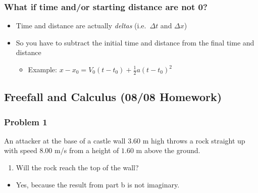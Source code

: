 \documentclass[
  letterpaper,
  DIV=11,
  numbers=noendperiod]{scrartcl}
\providecommand{\tightlist}{%
  \setlength{\itemsep}{0pt}\setlength{\parskip}{0pt}}\usepackage{longtable,booktabs,array}
\begin{document}
\hypertarget{what-if-time-andor-starting-distance-are-not-0}{%
\subsubsection{What if time and/or starting distance are not
0?}\label{what-if-time-andor-starting-distance-are-not-0}}

\begin{itemize}
\tightlist
\item
  Time and distance are actually \emph{deltas} (i.e.~\(\Delta t\) and
  \(\Delta x\))
\item
  So you have to subtract the initial time and distance from the final
  time and distance

  \begin{itemize}
  \tightlist
  \item
    Example: \(x-x_0 = V_0(t-t_0) + \frac{1}{2}a(t-t_0)^2\)
  \end{itemize}
\end{itemize}

\hypertarget{freefall-and-calculus-0808-homework}{%
\subsection{Freefall and Calculus (08/08
Homework)}\label{freefall-and-calculus-0808-homework}}

\hypertarget{problem-1-3}{%
\subsubsection{Problem 1}\label{problem-1-3}}

An attacker at the base of a castle wall \(3.60\) m high throws a rock
straight up with speed \(8.00\) m/s from a height of \(1.60\) m above
the ground.

\begin{enumerate}
\def\labelenumi{(\alph{enumi})}
\tightlist
\item
  Will the rock reach the top of the wall?
\end{enumerate}

\begin{itemize}
\tightlist
\item
  Yes, because the result from part b is not imaginary.
\end{itemize}
\end{document}
